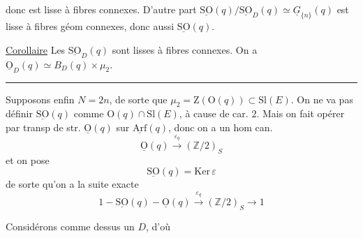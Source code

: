 donc est lisse à fibres connexes. D'autre part $\underline{\mathrm{SO}}(q)/\underline{\mathrm{SO}}_D(q)\simeq\underline G_{\{n\}}(q)$ est lisse à fibres géom connexes, donc aussi $\underline{\mathrm{SO}}(q)$.

\uline{Corollaire} Les $\underline{\mathrm{SO}}_D(q)$  sont lisses à fibres connexes. On a $\underline{\mathrm O}_D(q)\simeq B_D(q)\times\mu_2$.

\begin{center}\rule{.12\linewidth}{.4pt}\end{center}

Supposons enfin $N=2n$, de sorte que $\mu_2=\mathrm Z(\mathrm O(q))\subset\mathrm{Sl}(E)$. On ne va pas définir $\underline{\mathrm{SO}}(q)$ comme $\mathrm O(q)\cap\mathrm{Sl}(E)$, à cause de car. $2$. Mais on fait opérer par transp de str. $\underline{\mathrm O}(q)$ sur $\underline{\mathrm{Arf}}(q)$, donc on a un hom can.
\[
\underline{\mathrm O}(q)\xrightarrow{\varepsilon_q}(\mathbb Z/2)_S
\]
et on pose
\[
\underline{\mathrm{SO}}(q)=\mathrm{Ker}\,\varepsilon
\]
de sorte qu'on a la suite exacte
\[
1\mathbin{-}\underline{\mathrm{SO}}(q)\mathbin{-}\underline{\mathrm O}(q)\xrightarrow{\varepsilon_q}(\mathbb Z/2)_S\longrightarrow1
\]

%

Considérons comme dessus un $D$, d'où
